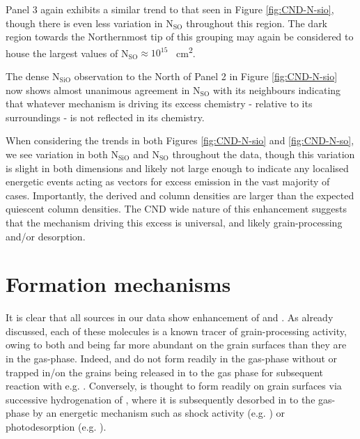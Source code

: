 \documentclass[twocolumn]{aastex631}
\begin{document}
Panel 3 again exhibits a similar trend to that seen in Figure \ref{fig:CND-N-sio}, though there is even less variation in N$_{\mathrm{SO}}$ throughout this region. The  dark region towards the Northernmost tip of this grouping may again be considered to house the largest values of N$_{\mathrm{SO}} \approx 10^{15}$ \si{\per\centi\meter\squared}.

The dense N$_{\mathrm{SiO}}$ observation to the North of Panel 2 in Figure \ref{fig:CND-N-sio} now shows almost unanimous agreement in N$_{\mathrm{SO}}$ with its neighbours indicating that whatever mechanism is driving its excess  chemistry - relative to its surroundings - is not reflected in its  chemistry. 

When considering the trends in both Figures \ref{fig:CND-N-sio} and \ref{fig:CND-N-so}, we see variation in both N$_{\mathrm{SiO}}$ and N$_{\mathrm{SO}}$ throughout the data, though this variation is slight in both dimensions and likely not large enough to indicate any localised energetic events acting as vectors for excess emission in the vast majority of cases. Importantly, the derived  and  column densities are larger than the expected quiescent column densities. The CND wide nature of this enhancement suggests that the mechanism driving this excess is universal, and likely grain-processing and/or desorption. 



\section{Formation mechanisms} \label{sec:emission}

It is clear that all sources in our data show enhancement of  and . As already discussed, each of these molecules is a known tracer of grain-processing activity, owing to both  and  being far more abundant on the grain surfaces than they are in the gas-phase. Indeed,  and  do not form readily in the gas-phase without  or  trapped in/on the grains being released in to the gas phase for subsequent reaction with  e.g. . Conversely,  is thought to form readily on grain surfaces via successive hydrogenation of , where it is subsequently desorbed in to the gas-phase by an energetic mechanism such as shock activity (e.g. \citet{jShocks}) or photodesorption (e.g. \citet{ch3ohPhotoDesorption}).
\end{document}
